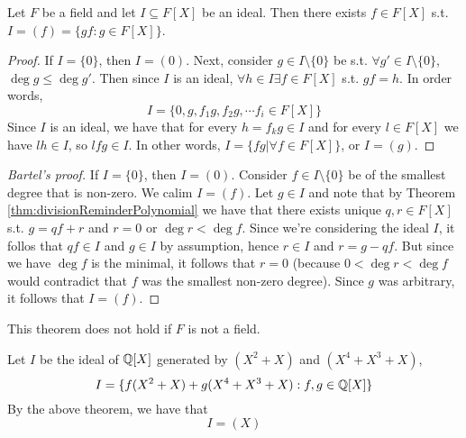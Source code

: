 \begin{theorem}
  Let $F$ be a field and let $I\subseteq F[X]$ be an ideal. Then there exists $f\in
  F[X]$ s.t. $I=(f)=\{gf : g\in F[X]\}$.
  \label{thm:idealPrinciplas}
\end{theorem}
\begin{proof}
  If $I=\{0\}$, then $I=(0)$. Next, consider $g\in I\setminus\{0\}$ be s.t. $\forall g'\in
  I\setminus\{0\}$, $\deg g \leq \deg g'$. Then since $I$ is an ideal,  $\forall h\in
  I\exists f\in F[X]$ s.t.  $gf=h$. In order words, 
  \[I= \{ 0, g, f_1g, f_2g, \cdots f_i\in F[X] \}\]
  Since $I$ is an ideal, we have that for every $h=f_k g \in I$ and for every $l\in F[X]$
  we have $lh\in I$, so $lfg \in I$. In other words, $I=\{fg | \forall f\in F[X]\}$, or
  $I=(g)$.
\end{proof}
\begin{proof}[Bartel's proof]
  If $I=\{0\}$, then $I=(0)$. Consider $f\in I\setminus \{0\}$ be of the smallest degree
  that is non-zero. We calim $I=(f)$. Let $g\in I$ and note that by Theorem
  \ref{thm:divisionReminderPolynomial} we have that there exists unique $q,r\in F[X]$ s.t.
  $g=qf+r$ and $r=0$ or $\deg r < \deg f$. Since we're considering the ideal $I$, it
  follos that $qf\in I$ and $g\in I$ by assumption, hence $r\in I$ and $r=g-qf$. But since
  we have $\deg f$ is the minimal, it follows that $r=0$ (because $0<\deg r<\deg f$ would
  contradict that $f$ was the smallest non-zero degree). Since $g$ was arbitrary, it
  follows that $I=(f)$.
\end{proof}
\begin{remark}
  This theorem does not hold if $F$ is not a field.
\end{remark}

\begin{example}
  Let $I$ be the ideal of $\mathbb Q[X]$ generated by $(X^2+X)$ and $(X^4+X^3+X)$, 
  \[I=\{f(X^2+X) + g(X^4+X^3+X) : f,g\in \mathbb Q[X]\}\]
  By the above theorem, we have that 
  \[I=(X)\]
\end{example}
